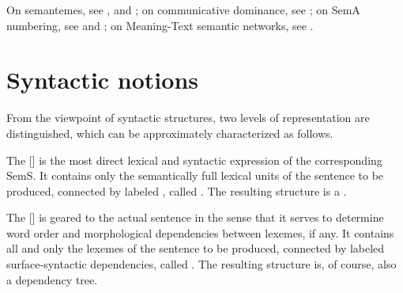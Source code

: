 \begin{furtherreading}
On semantemes, see \textcite{MelcukPolguere2008}, \textcite{Polguere2012a} and \textcite[Part~II, Sec.~2.2, 193--205]{Melcuk2012a-e}; on communicative dominance, see \textcite[Part~I, Sec.~2.3.1.1]{Melcuk2001b}; on SemA numbering, see \textcite[Ch.~12, Sec.~3.4.2.3]{Melcuk2015a-e} and \textcite[Ch.~4, Sec.~3]{Melcuk2012a-e}; on Meaning-Text semantic networks, see \textcite{Polguere1997-e}.
\end{furtherreading}

\section{Syntactic notions}\label{sec:syntacticNotions}

From the viewpoint of syntactic structures, two levels of representation are distinguished, which can be approximately characterized as follows.

The  []\label{txt:DSyntS} is the most direct lexical and syntactic expression of the corresponding SemS. It contains only the semantically full lexical units of the sentence to be produced, connected by labeled , called . The resulting structure is a .

The  [] is geared to the actual sentence in the sense that it serves to determine word order and morphological dependencies between lexemes, if any. It contains all and only the lexemes of the sentence to be produced, connected by labeled surface-syntactic dependencies, called . The resulting structure is, of course, also a dependency tree.

